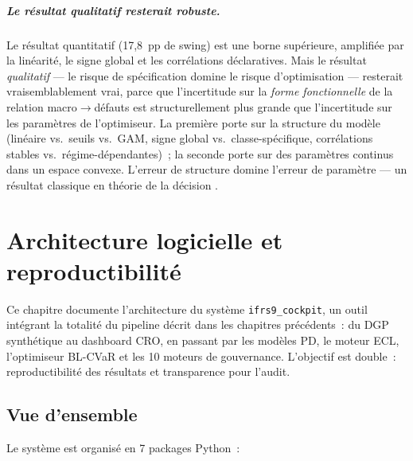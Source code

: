 \documentclass[12pt, a4paper, twoside, openright]{report}
\theoremstyle{definition}
\begin{document}
\paragraph{Le résultat qualitatif resterait robuste.}
Le résultat quantitatif (17,8~pp de swing) est une borne supérieure, amplifiée par la linéarité, le signe global et les corrélations déclaratives. Mais le résultat \emph{qualitatif} --- le risque de spécification domine le risque d'optimisation --- resterait vraisemblablement vrai, parce que l'incertitude sur la \emph{forme fonctionnelle} de la relation macro$\to$défauts est structurellement plus grande que l'incertitude sur les paramètres de l'optimiseur. La première porte sur la structure du modèle (linéaire vs.\ seuils vs.\ GAM, signe global vs.\ classe-spécifique, corrélations stables vs.\ régime-dépendantes)~; la seconde porte sur des paramètres continus dans un espace convexe. L'erreur de structure domine l'erreur de paramètre --- un résultat classique en théorie de la décision \citep{mcneil_frey_embrechts2015}.


\chapter{Architecture logicielle et reproductibilité}
\label{chap:architecture}

Ce chapitre documente l'architecture du système \texttt{ifrs9\_cockpit}, un outil intégrant la totalité du pipeline décrit dans les chapitres précédents~: du DGP synthétique au dashboard CRO, en passant par les modèles PD, le moteur ECL, l'optimiseur BL-CVaR et les 10 moteurs de gouvernance. L'objectif est double~: reproductibilité des résultats et transparence pour l'audit.

\section{Vue d'ensemble}
\label{sec:archi-overview}

Le système est organisé en 7 packages Python~:
\end{document}
